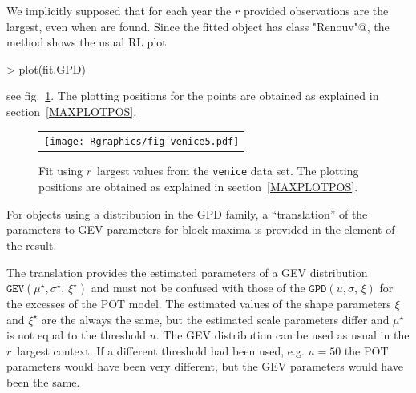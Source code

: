 \documentclass[a4paper]{report}
\begin{document}
\noindent
We implicitly supposed that for each year the $r$ provided observations
are the largest, even when \verb@NA@ are found.
Since the fitted object has class \verb@"Renouv"@, the \verb@plot@
method shows the usual RL plot

\begin{Schunk}
\begin{Sinput}
> plot(fit.GPD)
\end{Sinput}
\end{Schunk}

\noindent
see fig.~\ref{VenicerLarg}. The plotting positions for the points are
obtained as explained in section~\ref{MAXPLOTPOS}.

\begin{figure}
  \centering
  \begin{tabular}{c} 
     \texttt{[image: Rgraphics/fig-venice5.pdf]} 
   \end{tabular}
   \caption{\label{VenicerLarg} 
     Fit using $r$~largest values from the \texttt{venice} data
     set.  The plotting positions are obtained as explained in
     section~\ref{MAXPLOTPOS}.}
\end{figure}

For \verb@Renouv@ objects using a distribution in the GPD family, a
``translation'' of the parameters to GEV parameters for block maxima is
provided in the \verb@MAX@ element of the result.

\begin{Schunk}
\end{Schunk}

\noindent
The translation provides the estimated parameters of a GEV
distribution $\texttt{GEV}(\mu^\star,\sigma^\star,\,\xi^\star)$ and
must not be confused with those of the $\texttt{GPD}(u,\sigma,\,\xi)$
for the excesses of the POT model. The estimated values of the shape
parameters $\xi$ and $\xi^\star$ are the always the same, but the
estimated scale parameters differ and $\mu^\star$ is not equal to the
threshold $u$.  The GEV distribution can be used as usual in the
$r$~largest context. If a different threshold had been used, e.g. $u =
50$ the POT parameters would have been very different, but the GEV
parameters would have been the same.
\end{document}
